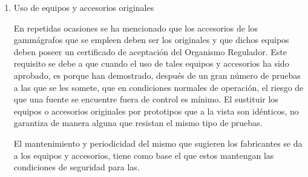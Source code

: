 
\begin{enumerate}
         \item [b)] Uso de equipos y accesorios originales

        En repetidas ocasiones se ha mencionado que los accesorios de los gammágrafos que se empleen deben ser los originales y que dichos equipos deben poseer un certificado de aceptación del Organismo Regulador. Este requisito se debe a que cuando el uso de tales equipos y accesorios ha sido aprobado, es porque han demostrado, después de un gran número de pruebas a las que se les somete, que en condiciones normales de operación, el riesgo de que una fuente se encuentre fuera de control es mínimo. El sustituir los equipos o accesorios originales por prototipos que a la vista son idénticos, no garantiza de manera alguna que resistan el mismo tipo de pruebas.

        El mantenimiento y periodicidad del mismo que sugieren los fabricantes se da a los equipos y accesorios, tiene como base el que estos mantengan las condiciones de seguridad para las.
\end{enumerate}

